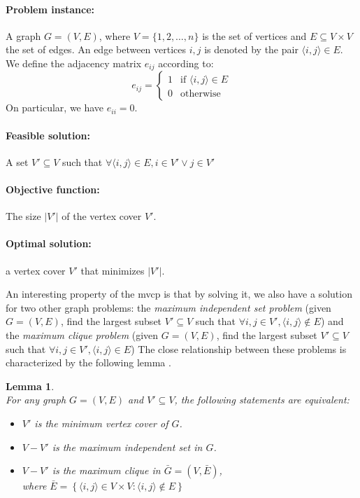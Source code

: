 \documentclass[12pt]{article}
\newtheorem{lemma}{Lemma}
\begin{document}
{
\setlength{\parskip}{0em}
\paragraph{Problem instance:}
A graph $G = (V, E)$, where $V = \{1, 2, \dots, n\}$
is the set of vertices and $E \subseteq V \times V$ the
set of edges.
An edge between vertices $i, j$ is denoted
by the pair $\langle i, j \rangle \in E$.
We define the adjacency matrix $e_{ij}$ according to:
\[
e_{ij} =
\begin{cases}
1 & \text{if } \langle i, j \rangle \in E \\
0 & \text{otherwise}
\end{cases}
\]
On particular, we have $e_{ii} = 0$.

\paragraph{Feasible solution:} A set $V' \subseteq V$ such that
$\forall \langle i, j \rangle \in E, i \in V' \vee j \in V'$
\paragraph{Objective function:} The size $|V'|$ of the vertex cover $V'$.
\paragraph{Optimal solution:} a vertex cover $V'$ that minimizes $|V'|$.
}

An interesting property of the mvcp is that by
solving it, we also have a solution for two other
graph problems: the \textit{maximum independent set problem}
(given $G = (V, E)$, find the largest subset $V' \subseteq V$
such that $\forall i, j \in V', \langle i, j \rangle \notin E$)
and the \textit{maximum clique problem}
(given $G = (V, E)$, find the largest subset $V' \subseteq V$
such that $\forall i, j \in V', \langle i, j \rangle \in E$)
The close relationship between these problems is characterized
by the following lemma \cite{6:misp}.
\begin{lemma}
\label{lem}
\ \\[3mm]
For any graph $G = (V, E)$ and $V' \subseteq V$, the following
statements are equivalent:
\begin{itemize}
\vspace{-3mm}
\setlength{\parskip}{0.5em}
\item $V'$ is the minimum vertex cover of $G$.
\item $V - V'$ is the maximum independent set in $G$.
\item $V - V'$ is the maximum clique in $\bar{G} = (V, \bar{E})$,\\[1mm]
where
$\bar{E}=\left\{ \langle i, j \rangle\in V \times V :
\langle i, j \rangle \notin E \right\}$
\end{itemize}
\end{lemma}
\end{document}
